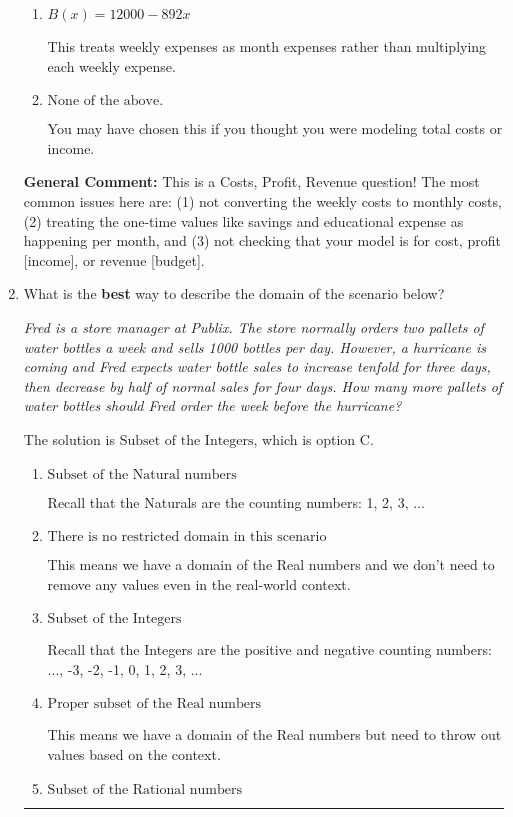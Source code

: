 \documentclass{extbook}[14pt]
\newcommand{\litem}[1]{\item #1

\rule{\textwidth}{0.4pt}}
\begin{document}
\begin{enumerate}
{\begin{enumerate}[label=\Alph*.]
This treats the educational expense and savings as something you get every month rather than a 1-time payment.
\item \( B(x) = 12000 - 892 x \)

This treats weekly expenses as month expenses rather than multiplying each weekly expense.
\item \( \text{None of the above.} \)

You may have chosen this if you thought you were modeling total costs or income.
\end{enumerate}

\textbf{General Comment:} This is a Costs, Profit, Revenue question! The most common issues here are: (1) not converting the weekly costs to monthly costs, (2) treating the one-time values like savings and educational expense as happening per month, and (3) not checking that your model is for cost, profit [income], or revenue [budget].
}
\litem{
What is the \textbf{best} way to describe the domain of the scenario below?

\begin{center}
    \textit{ Fred is a store manager at Publix. The store normally orders two pallets of water bottles a week and sells 1000 bottles per day. However, a hurricane is coming and Fred expects water bottle sales to increase tenfold for three days, then decrease by half of normal sales for four days. How many more pallets of water bottles should Fred order the week before the hurricane? }
\end{center}
The solution is \( \text{Subset of the Integers} \), which is option C.\begin{enumerate}[label=\Alph*.]
\item \( \text{Subset of the Natural numbers} \)

Recall that the Naturals are the counting numbers: 1, 2, 3, ...
\item \( \text{There is no restricted domain in this scenario} \)

This means we have a domain of the Real numbers and we don't need to remove any values even in the real-world context.
\item \( \text{Subset of the Integers} \)

Recall that the Integers are the positive and negative counting numbers: ..., -3, -2, -1, 0, 1, 2, 3, ... 
\item \( \text{Proper subset of the Real numbers} \)

This means we have a domain of the Real numbers but need to throw out values based on the context.
\item \( \text{Subset of the Rational numbers} \)


\end{enumerate}}
\end{enumerate}
\end{document}
